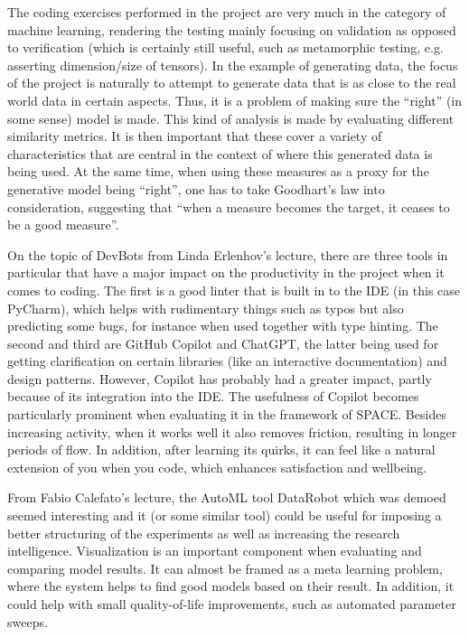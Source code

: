\documentclass[11pt]{article}
\begin{document}
The coding exercises performed in the project are very much in the category of machine learning, rendering the testing mainly focusing on validation as opposed to verification (which is certainly still useful, such as metamorphic testing, e.g. asserting dimension/size of tensors). In the example of generating data, the focus of the project is naturally to attempt to generate data that is as close to the real world data in certain aspects. Thus, it is a problem of making sure the ``right'' (in some sense) model is made. This kind of analysis is made by evaluating different similarity metrics. It is then important that these cover a variety of characteristics that are central in the context of where this generated data is being used. At the same time, when using these measures as a proxy for the generative model being ``right'', one has to take Goodhart's law into consideration, suggesting that ``when a measure becomes the target, it ceases to be a good measure''.

On the topic of DevBots from Linda Erlenhov's lecture, there are three tools in particular that have a major impact on the productivity in the project when it comes to coding. The first is a good linter that is built in to the IDE (in this case PyCharm), which helps with rudimentary things such as typos but also predicting some bugs, for instance when used together with type hinting. The second and third are GitHub Copilot and ChatGPT, the latter being used for getting clarification on certain libraries (like an interactive documentation) and design patterns. However, Copilot has probably had a greater impact, partly because of its integration into the IDE. The usefulness of Copilot becomes particularly prominent when evaluating it in the framework of SPACE. Besides increasing activity, when it works well it also removes friction, resulting in longer periods of flow. In addition, after learning its quirks, it can feel like a natural extension of you when you code, which enhances satisfaction and wellbeing.

From Fabio Calefato's lecture, the AutoML tool DataRobot which was demoed seemed interesting and it (or some similar tool) could be useful for imposing a better structuring of the experiments as well as increasing the research intelligence. Visualization is an important component when evaluating and comparing model results. It can almost be framed as a meta learning problem, where the system helps to find good models based on their result. In addition, it could help with small quality-of-life improvements, such as automated parameter sweeps.
\end{document}
